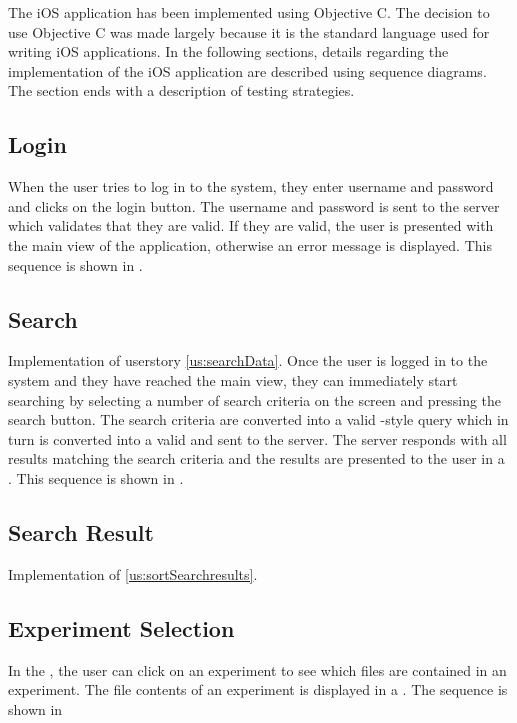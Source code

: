 The iOS application has been implemented using Objective C. The decision to use Objective C was made largely because it is the standard language used for writing iOS applications. 
In the following sections, details regarding the implementation of the iOS application are described using sequence diagrams. The section ends with a description of testing strategies.

\subsection{Login}

When the user tries to log in to the system, they enter username and password and clicks on the login button. The username and password is sent to the server which validates that they are valid. If they are valid, the user is presented with the main view of the application, otherwise an error message is displayed. This sequence is shown in .


\subsection{Search}
Implementation of userstory \ref{us:searchData}. Once the user is logged in to the system and they have reached the main view, they can immediately start searching by selecting a number of search criteria on the screen and pressing the search button. The search criteria are converted into a valid -style query which in turn is converted into a valid  and sent to the server. The server responds with all results matching the search criteria and the results are presented to the user in a . This sequence is shown in .

\subsection{Search Result}
Implementation of \ref{us:sortSearchresults}.

\subsection{Experiment Selection}

In the , the user can click on an experiment to see which files are contained in an experiment. The file contents of an experiment is displayed in a . The sequence is shown in  


